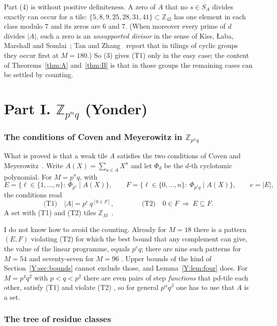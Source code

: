 \documentclass[11pt,a4paper]{amsart}
\theoremstyle{definition}
\theoremstyle{remark}
\newcommand{\Z}{\mathbb{Z}}
\begin{document}
Part (4) is \cite[Prop.~4.1]{KLMS} without positive definiteness. A zero of $A$ that no $s\in S_A$ divides
exactly can occur for a tile: $\{5,8,9,25,28,31,41\}\subset\Z_{42}$ has one element in each class modulo $7$ and
its zeros are $6$ and $7$. (When moreover every prime of $d$ divides $|A|$, such a zero is an \emph{unsupported
divisor} in the sense of Kiss, {\L}aba, Marshall and Somlai~\cite[Definition~1.5]{KLaMS}; Tan and
Zhang~\cite{TZ} report that in tilings of cyclic groups they occur first at $M=180$.) So
(3) gives (T1) only in the easy case; the content of Theorems~\ref{thm:A} and~\ref{thm:B} is that in those groups the remaining cases can be settled
by counting.


\part*{Part I. \texorpdfstring{$\Z_{p^nq}$}{Z\_{p\^{}nq}} (Yonder)}

\section{The conditions of Coven and Meyerowitz in \texorpdfstring{$\Z_{p^nq}$}{p\^{}nq}}\label{Y:sec:cm}

What is proved is that a weak tile $A$ satisfies the two conditions of Coven and Meyerowitz~\cite{CM}. Write
$A(X)=\sum_{a\in A}X^a$ and let $\Phi_d$ be the $d$-th cyclotomic polynomial. For $M=p^nq$, with
\[
 E=\{\ell\in\{1,\dots,n\}:\ \Phi_{p^\ell}\mid A(X)\},\qquad
 F=\{\ell\in\{0,\dots,n\}:\ \Phi_{p^\ell q}\mid A(X)\},\qquad e=|E|,
\]
the conditions read
\[
 \text{(T1)}\quad |A|=p^{e}\,q^{[0\in F]},\qquad\qquad \text{(T2)}\quad 0\in F\ \Longrightarrow\ E\subseteq F .
\]
A set with (T1) and (T2) tiles $\Z_M$~\cite{CM}.


I do not know how to avoid the counting. Already for $M=18$ there is a pattern $(E,F)$ violating (T2) for which
the best bound that any complement can give, the value of the linear programme, equals $p^eq$; there are nine
such patterns for $M=54$ and seventy-seven for $M=96$ \cite{Ynote}. Upper bounds of the kind of Section~\ref{Y:sec:bounds} cannot exclude
those, and Lemma~\ref{Y:lem:four} does. For $M=p^4q^2$ with $p<q<p^2$ there are even pairs of step
\emph{functions} that pd-tile each other, satisfy (T1) and violate (T2) \cite[Theorem~1.4]{KLMS}, so for
general $p^\alpha q^\beta$ one has to use that $A$ is a set.

\section{The tree of residue classes}\label{Y:sec:tree}
\end{document}
